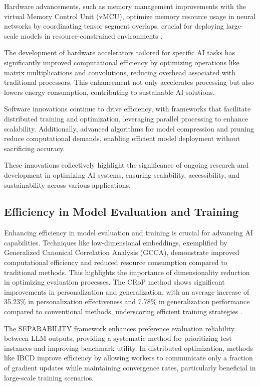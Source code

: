 Hardware advancements, such as memory management improvements with the virtual Memory Control Unit (vMCU), optimize memory resource usage in neural networks by coordinating tensor segment overlaps, crucial for deploying large-scale models in resource-constrained environments \cite{zheng2024vmcucoordinatedmemorymanagement}. 

The development of hardware accelerators tailored for specific AI tasks has significantly improved computational efficiency by optimizing operations like matrix multiplications and convolutions, reducing overhead associated with traditional processors. This enhancement not only accelerates processing but also lowers energy consumption, contributing to sustainable AI solutions.

Software innovations continue to drive efficiency, with frameworks that facilitate distributed training and optimization, leveraging parallel processing to enhance scalability. Additionally, advanced algorithms for model compression and pruning reduce computational demands, enabling efficient model deployment without sacrificing accuracy.

These innovations collectively highlight the significance of ongoing research and development in optimizing AI systems, ensuring scalability, accessibility, and sustainability across various applications.


\subsection{Efficiency in Model Evaluation and Training} \label{subsec:Efficiency in Model Evaluation and Training}



Enhancing efficiency in model evaluation and training is crucial for advancing AI capabilities. Techniques like low-dimensional embeddings, exemplified by Generalized Canonical Correlation Analysis (GCCA), demonstrate improved computational efficiency and reduced resource consumption compared to traditional methods. This highlights the importance of dimensionality reduction in optimizing evaluation processes. The CRoP method shows significant improvements in personalization and generalization, with an average increase of 35.23\% in personalization effectiveness and 7.78\% in generalization performance compared to conventional methods, underscoring efficient training strategies \cite{kaur2024cropcontextwiserobuststatic}.

The SEPARABILITY framework enhances preference evaluation reliability between LLM outputs, providing a systematic method for prioritizing test instances and improving benchmark utility. In distributed optimization, methods like IBCD improve efficiency by allowing workers to communicate only a fraction of gradient updates while maintaining convergence rates, particularly beneficial in large-scale training scenarios.

